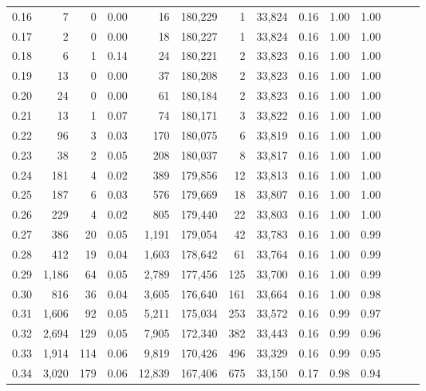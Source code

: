 \begin{tabular}{rrrrrrrrrrrrrr}
0.16 &      7 &      0 &  0.00 &       16 &  180,229 &       1 &  33,824 &  0.16 &  1.00 &      1.00 \\
0.17 &      2 &      0 &  0.00 &       18 &  180,227 &       1 &  33,824 &  0.16 &  1.00 &      1.00 \\
0.18 &      6 &      1 &  0.14 &       24 &  180,221 &       2 &  33,823 &  0.16 &  1.00 &      1.00 \\
0.19 &     13 &      0 &  0.00 &       37 &  180,208 &       2 &  33,823 &  0.16 &  1.00 &      1.00 \\
0.20 &     24 &      0 &  0.00 &       61 &  180,184 &       2 &  33,823 &  0.16 &  1.00 &      1.00 \\
0.21 &     13 &      1 &  0.07 &       74 &  180,171 &       3 &  33,822 &  0.16 &  1.00 &      1.00 \\
0.22 &     96 &      3 &  0.03 &      170 &  180,075 &       6 &  33,819 &  0.16 &  1.00 &      1.00 \\
0.23 &     38 &      2 &  0.05 &      208 &  180,037 &       8 &  33,817 &  0.16 &  1.00 &      1.00 \\
0.24 &    181 &      4 &  0.02 &      389 &  179,856 &      12 &  33,813 &  0.16 &  1.00 &      1.00 \\
0.25 &    187 &      6 &  0.03 &      576 &  179,669 &      18 &  33,807 &  0.16 &  1.00 &      1.00 \\
0.26 &    229 &      4 &  0.02 &      805 &  179,440 &      22 &  33,803 &  0.16 &  1.00 &      1.00 \\
0.27 &    386 &     20 &  0.05 &    1,191 &  179,054 &      42 &  33,783 &  0.16 &  1.00 &      0.99 \\
0.28 &    412 &     19 &  0.04 &    1,603 &  178,642 &      61 &  33,764 &  0.16 &  1.00 &      0.99 \\
0.29 &  1,186 &     64 &  0.05 &    2,789 &  177,456 &     125 &  33,700 &  0.16 &  1.00 &      0.99 \\
0.30 &    816 &     36 &  0.04 &    3,605 &  176,640 &     161 &  33,664 &  0.16 &  1.00 &      0.98 \\
0.31 &  1,606 &     92 &  0.05 &    5,211 &  175,034 &     253 &  33,572 &  0.16 &  0.99 &      0.97 \\
0.32 &  2,694 &    129 &  0.05 &    7,905 &  172,340 &     382 &  33,443 &  0.16 &  0.99 &      0.96 \\
0.33 &  1,914 &    114 &  0.06 &    9,819 &  170,426 &     496 &  33,329 &  0.16 &  0.99 &      0.95 \\
0.34 &  3,020 &    179 &  0.06 &   12,839 &  167,406 &     675 &  33,150 &  0.17 &  0.98 &      0.94 \\

\end{tabular}
